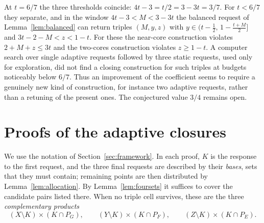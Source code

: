 \documentclass[11pt]{article}
\numberwithin{equation}{section}
\theoremstyle{definition}
\theoremstyle{remark}
\begin{document}
At $t=6/7$ the three thresholds coincide: $4t-3=t/2=3-3t=3/7$. For
$t<6/7$ they separate, and in the window $4t-3<M<3-3t$ the balanced
request of Lemma~\ref{lem:balanced} can return triples
$(M,y,z)$ with $y\in(t-\tfrac12,\,1-\tfrac{t+M}2]$ and
$3t-2-M<z<1-t$. For these the near-core construction violates
$2+M+z\le3t$ and the two-cores construction violates $z\ge1-t$. A
computer search
over single adaptive requests followed by three static requests, used
only for exploration, did not find a closing construction for such
triples at budgets noticeably below $6/7$. Thus an improvement of the
coefficient seems to require a genuinely new kind of construction, for
instance two adaptive requests, rather than a retuning of the present
ones. The conjectured value $3/4$ remains open.

\appendix
\section{Proofs of the adaptive closures}\label{app:adaptive}

We use the notation of Section~\ref{sec:framework}. In each proof, $K$
is the response to the first request, and the three final requests are
described by their \emph{bases}, sets that they must contain; remaining
points are then distributed by Lemma~\ref{lem:allocation}. By
Lemma~\ref{lem:foursets} it suffices to cover the candidate pairs listed
there. When no triple cell survives, these are the three
\emph{complementary products}
\[
 (X\setminus K)\times(K\cap P_G),\qquad
 (Y\setminus K)\times(K\cap P_F),\qquad
 (Z\setminus K)\times(K\cap P_E).
\]
\end{document}
